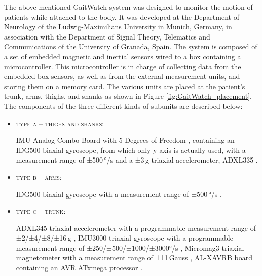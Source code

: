 The above-mentioned GaitWatch system was designed to monitor the motion of patients while attached to the body. It was developed at the Department of Neurology of the Ludwig-Maximilians University in Munich, Germany, in association with the Department of Signal Theory, Telematics and Communications of the University of Granada, Spain. The system is composed of a set of embedded magnetic and inertial sensors wired to a box containing a microcontroller. This microcontroller is in charge of collecting data from the embedded box sensors, as well as from the external measurement units, and storing them on a memory card. The various units are placed at the patient's trunk, arms, thighs, and shanks as shown in Figure \ref{fig:GaitWatch_placement}. The components of the three different kinds of subunits are described below:

\begin{itemize}

\item \textsc{type a -- thighs and shanks:} 

IMU Analog Combo Board with 5 Degrees of Freedom \cite{IMU5}, containing an IDG500 biaxial gyroscope, from which only y-axis is actually used, with a measurement range of ±500\,°/s \cite{IDG500} and a ±3\,g triaxial accelerometer, ADXL335 \cite{ADXL335}.

\item \textsc{type b -- arms:}

IDG500 biaxial gyroscope with a measurement range of ±500\,°/s \cite{IDG500}.

\item \textsc{type c -- trunk:}

ADXL345 triaxial accelerometer with a programmable measurement range of ±2/±4/±8/±16\,g \cite{ADXL345},
IMU3000 triaxial gyroscope with a programmable measurement range of ±250/±500/±1000/±3000°/s \cite{IMU3000}, 
Micromag3 \allowbreak triaxial magnetometer with a measurement range of ±11\,Gauss \cite{MicroMag3}, AL-XAVRB board containing an AVR ATxmega processor \cite{AVRATxmega}.

\end{itemize}

